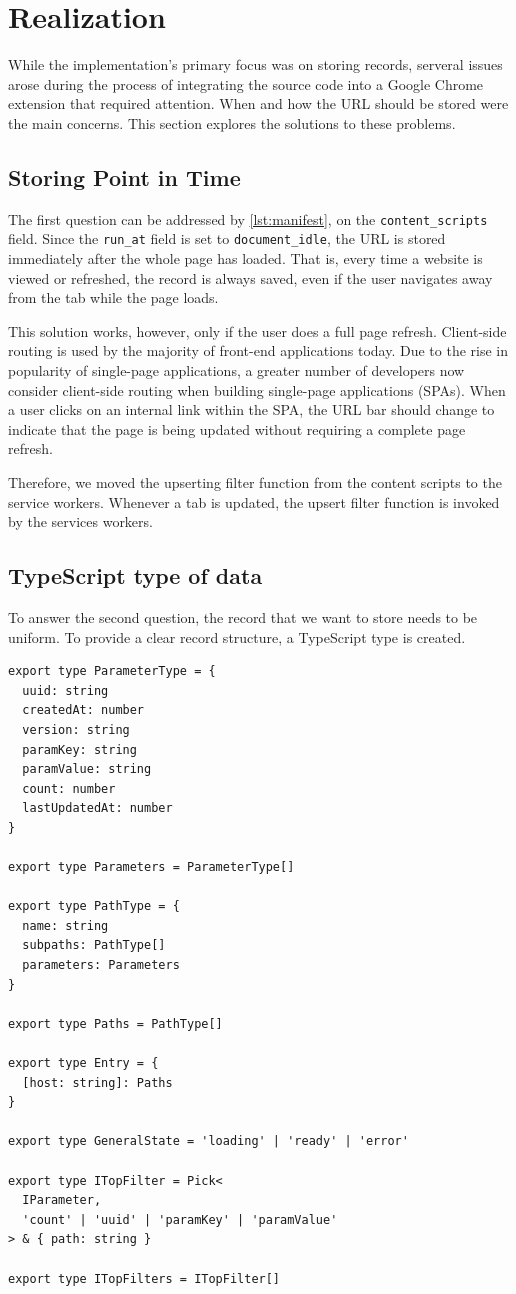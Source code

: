 \section{Realization}
While the implementation's primary focus was on storing records, serveral issues arose during the process of integrating the source code into a Google Chrome extension that required attention. When and how the URL should be stored were the main concerns. This section explores the solutions to these problems.

\subsection*{Storing Point in Time}
The first question can be addressed by \autoref{lst:manifest}, on the \verb;content_scripts; field. Since the \verb;run_at; field is set to \verb;document_idle;, the URL is stored immediately after the whole page has loaded. That is, every time a website is viewed or refreshed, the record is always saved, even if the user navigates away from the tab while the page loads.

This solution works, however, only if the user does a full page refresh. Client-side routing is used by the majority of front-end applications today. Due to the rise in popularity of single-page applications, a greater number of developers now consider client-side routing when building single-page applications (SPAs). When a user clicks on an internal link within the SPA, the URL bar should change to indicate that the page is being updated without requiring a complete page refresh.

Therefore, we moved the upserting filter function from the content scripts to the service workers. Whenever a tab is updated, the upsert filter function is invoked by the services workers.

\subsection*{TypeScript type of data}
To answer the second question, the record that we want to store needs to be uniform. To provide a clear record structure, a TypeScript type is created.

\begin{lstlisting}[style=es6, caption={TypeScript type of a record entry (TypeScript)}]
export type ParameterType = {
  uuid: string
  createdAt: number
  version: string
  paramKey: string
  paramValue: string
  count: number
  lastUpdatedAt: number
}

export type Parameters = ParameterType[]

export type PathType = {
  name: string
  subpaths: PathType[]
  parameters: Parameters
}

export type Paths = PathType[]

export type Entry = {
  [host: string]: Paths
}

export type GeneralState = 'loading' | 'ready' | 'error'

export type ITopFilter = Pick<
  IParameter,
  'count' | 'uuid' | 'paramKey' | 'paramValue'
> & { path: string }

export type ITopFilters = ITopFilter[]
\end{lstlisting}


